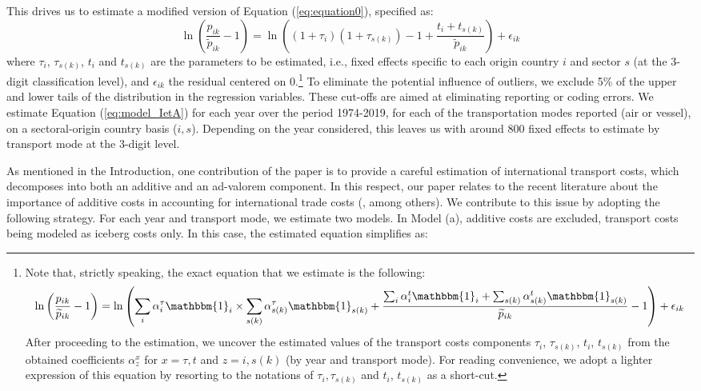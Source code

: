 \documentclass[a4paper,11pt]{article}
\begin{document}
This drives us to estimate a modified version of Equation (\ref{eq:equation0}), specified as:
\begin{equation}
\ln\left(\frac{p_{ik}}{\widetilde{p}_{ik}}-1 \right)= \ln \left((1+\tau_{i})(1+ \tau_{s(k)})-1+\frac{t_{i} + t_{s(k)}}{\widetilde{p}_{ik}} \right) + \epsilon_{ik} \label{eq:model_IetA}
\end{equation}
where $\tau_{i}$, $\tau_{s(k)}$, $t_{i}$ and $t_{s(k)}$ are the parameters to be estimated, i.e., fixed effects specific to each origin country $i$ and sector $s$ (at the 3-digit classification level), and $\epsilon_{ik}$ the residual centered on 0.\footnote{Note that, strictly speaking, the exact equation that we estimate is the following:
$$\ln\left(\frac{p_{ik}}{\widetilde{p}_{ik}}-1 \right)= \ln \left(\sum_i \alpha_i^\tau \mathbbm{1}_i \times \sum_{s(k)}\alpha_{s(k)}^\tau \mathbbm{1}_{s(k)}+ \frac{\sum_i\alpha_i^t\mathbbm{1}_i + \sum_{s(k)}\alpha^t_{s(k)}\mathbbm{1}_{s(k)}}{\widetilde{p}_{ik}}-1\right)+\epsilon_{ik} $$
After proceeding to the estimation, we uncover the estimated values of the transport costs components $\tau_{i}$, $\tau_{s(k)}$, $t_{i}$, $t_{s(k)}$ from the obtained coefficients $\alpha^{x}_{z}$ for $x=\tau,t$ and $z=i,s(k)$ (by year and transport mode).
For reading convenience, we adopt a lighter expression of this equation by resorting to the notations of $\tau_i,\tau_{s(k)}$ and $t_i$, $t_{s(k)}$ as a short-cut.}  To eliminate the potential influence of outliers, we exclude 5\% of the upper and lower tails of the distribution in the regression variables.
These cut-offs are aimed at eliminating reporting or coding errors.
We estimate Equation (\ref{eq:model_IetA}) for each year over the period 1974-2019, for each of the transportation modes reported (air or vessel), on a sectoral-origin country basis ($i,s$).
Depending on the year considered, this leaves us with around 800 fixed effects to estimate by transport mode at the 3-digit level.
  \medskip



As mentioned in the Introduction, one contribution of the paper is to provide a careful estimation of international transport costs, which decomposes into both an additive and an ad-valorem component.
In this respect, our paper relates to the recent literature about the importance of additive costs in accounting for international trade costs (\citealp{Irrazabal_2015}, among others).
We contribute to this issue by adopting the following strategy.
For each year and transport mode, we estimate two models.
In Model (a), additive costs are excluded, transport costs being modeled as iceberg costs only. In this case, the estimated equation simplifies as:
\end{document}

